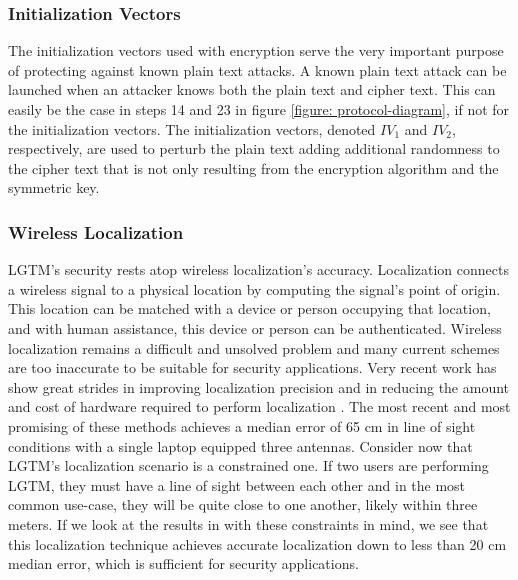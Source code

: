 \documentclass[12pt]{report}
\begin{document}
\subsubsection{Initialization Vectors}
The initialization vectors used with encryption serve the very important purpose of protecting against known plain text attacks. A known plain text attack can be launched when an attacker knows both the plain text and cipher text. This can easily be the case in steps 14 and 23 in figure \ref{figure: protocol-diagram}, if not for the initialization vectors. The initialization vectors, denoted $IV_{1}$ and $IV_{2}$, respectively, are used to perturb the plain text adding additional randomness to the cipher text that is not only resulting from the encryption algorithm and the symmetric key. \par

\subsubsection{Wireless Localization}
LGTM's security rests atop wireless localization's accuracy. Localization connects a wireless signal to a physical location by computing the signal's point of origin. This location can be matched with a device or person occupying that location, and with human assistance, this device or person can be authenticated. Wireless localization remains a difficult and unsolved problem and many current schemes are too inaccurate to be suitable for security applications. Very recent work has show great strides in improving localization precision and in reducing the amount and cost of hardware required to perform localization \cite{UbicarseKumar2014,SpotFiKotaru2015,ChronosSingleAPLocalizationVasisht2016}. The most recent and most promising of these methods \cite{ChronosSingleAPLocalizationVasisht2016} achieves a median error of 65 cm in line of sight conditions with a single laptop equipped three antennas. Consider now that LGTM's localization scenario is a constrained one. If two users are performing LGTM, they must have a line of sight between each other and in the most common use-case, they will be quite close to one another, likely within three meters. If we look at the results in \cite{ChronosSingleAPLocalizationVasisht2016} with these constraints in mind, we see that this localization technique achieves accurate localization down to less than 20 cm median error, which is sufficient for security applications. \par
\end{document}
